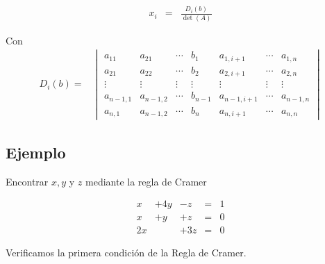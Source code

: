 \documentclass[
]{article}
\begin{document}
\begin{equation}\label{eq:Cramer}
\begin{array}{ccc}
x_i &=& \frac{D_i(b)}{\det(A)}
\end{array}
\end{equation}

Con \begin{equation}
\begin{array}{ccc}
D_{i}(b) = &  \begin{vmatrix} 
                  a_{11}     & a_{21}    & \cdots   & b_{1}      &  a_{1,i+1} &\cdots    & a_{1,n}      \\ 
                  a_{21}     & a_{22}    & \cdots   & b_{2}      & a_{2,i+1}  &\cdots    & a_{2,n}      \\
                  \vdots     & \vdots    & \vdots   &  \vdots    & \vdots     &\vdots    &  \vdots      \\
                  a_{n-1,1}  & a_{n-1,2} & \cdots   & b_{n-1}    & a_{n-1,i+1}&\cdots    & a_{n-1,n}    \\
                  a_{n,1}    &  a_{n-1,2}& \cdots   & b_{n}      & a_{n,i+1}  &\cdots    & a_{n,n}
  \end{vmatrix} 
\end{array}
\end{equation}

\hypertarget{ejemplo-8}{%
\subsection{Ejemplo}\label{ejemplo-8}}

Encontrar \(x,y\) y \(z\) mediante la regla de Cramer

\begin{equation}
\begin{array}{cccccc}
     x & +4y   &-z  & = & 1       \\ 
     x & +y    &+z  & = & 0       \\
     2x&       &+3z & = & 0
\end{array}
\end{equation}

Verificamos la primera condición de la Regla de Cramer.
\end{document}
